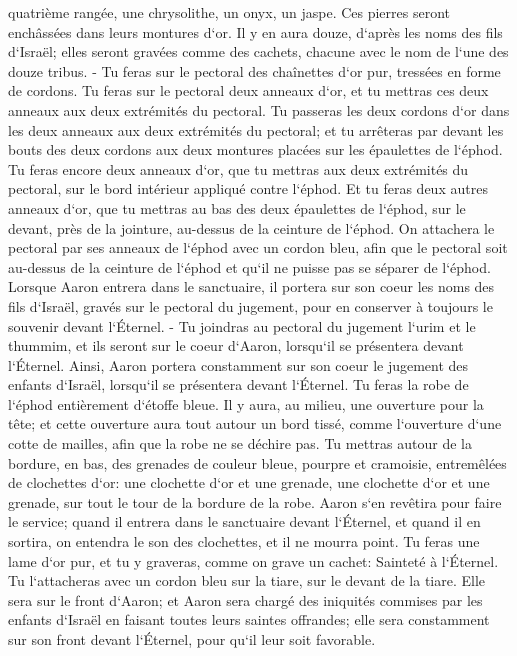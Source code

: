 \verse quatrième rangée, une chrysolithe, un onyx, un jaspe. Ces pierres seront enchâssées dans leurs montures d`or. 
\verse Il y en aura douze, d`après les noms des fils d`Israël; elles seront gravées comme des cachets, chacune avec le nom de l`une des douze tribus. - 
\verse Tu feras sur le pectoral des chaînettes d`or pur, tressées en forme de cordons. 
\verse Tu feras sur le pectoral deux anneaux d`or, et tu mettras ces deux anneaux aux deux extrémités du pectoral. 
\verse Tu passeras les deux cordons d`or dans les deux anneaux aux deux extrémités du pectoral; 
\verse et tu arrêteras par devant les bouts des deux cordons aux deux montures placées sur les épaulettes de l`éphod. 
\verse Tu feras encore deux anneaux d`or, que tu mettras aux deux extrémités du pectoral, sur le bord intérieur appliqué contre l`éphod. 
\verse Et tu feras deux autres anneaux d`or, que tu mettras au bas des deux épaulettes de l`éphod, sur le devant, près de la jointure, au-dessus de la ceinture de l`éphod. 
\verse On attachera le pectoral par ses anneaux de l`éphod avec un cordon bleu, afin que le pectoral soit au-dessus de la ceinture de l`éphod et qu`il ne puisse pas se séparer de l`éphod. 
\verse Lorsque Aaron entrera dans le sanctuaire, il portera sur son coeur les noms des fils d`Israël, gravés sur le pectoral du jugement, pour en conserver à toujours le souvenir devant l`Éternel. - 
\verse Tu joindras au pectoral du jugement l`urim et le thummim, et ils seront sur le coeur d`Aaron, lorsqu`il se présentera devant l`Éternel. Ainsi, Aaron portera constamment sur son coeur le jugement des enfants d`Israël, lorsqu`il se présentera devant l`Éternel. 
\verse Tu feras la robe de l`éphod entièrement d`étoffe bleue. 
\verse Il y aura, au milieu, une ouverture pour la tête; et cette ouverture aura tout autour un bord tissé, comme l`ouverture d`une cotte de mailles, afin que la robe ne se déchire pas. 
\verse Tu mettras autour de la bordure, en bas, des grenades de couleur bleue, pourpre et cramoisie, entremêlées de clochettes d`or: 
\verse une clochette d`or et une grenade, une clochette d`or et une grenade, sur tout le tour de la bordure de la robe. 
\verse Aaron s`en revêtira pour faire le service; quand il entrera dans le sanctuaire devant l`Éternel, et quand il en sortira, on entendra le son des clochettes, et il ne mourra point. 
\verse Tu feras une lame d`or pur, et tu y graveras, comme on grave un cachet: Sainteté à l`Éternel. 
\verse Tu l`attacheras avec un cordon bleu sur la tiare, sur le devant de la tiare. 
\verse Elle sera sur le front d`Aaron; et Aaron sera chargé des iniquités commises par les enfants d`Israël en faisant toutes leurs saintes offrandes; elle sera constamment sur son front devant l`Éternel, pour qu`il leur soit favorable. 
